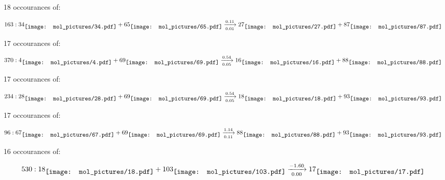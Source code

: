 \documentclass{article}
\begin{document}
18 occourances of:

$$
163:  
34
\raisebox{-.5\height}{\texttt{[image: mol\_pictures/34.pdf]}}
+
65
\raisebox{-.5\height}{\texttt{[image: mol\_pictures/65.pdf]}}
\xrightarrow[0.01]{0.11}
27
\raisebox{-.5\height}{\texttt{[image: mol\_pictures/27.pdf]}}
+
87
\raisebox{-.5\height}{\texttt{[image: mol\_pictures/87.pdf]}}
$$



\vspace{1cm}


17 occourances of:

$$
370:  
4
\raisebox{-.5\height}{\texttt{[image: mol\_pictures/4.pdf]}}
+
69
\raisebox{-.5\height}{\texttt{[image: mol\_pictures/69.pdf]}}
\xrightarrow[0.05]{0.54}
16
\raisebox{-.5\height}{\texttt{[image: mol\_pictures/16.pdf]}}
+
88
\raisebox{-.5\height}{\texttt{[image: mol\_pictures/88.pdf]}}
$$



\vspace{1cm}


17 occourances of:

$$
234:  
28
\raisebox{-.5\height}{\texttt{[image: mol\_pictures/28.pdf]}}
+
69
\raisebox{-.5\height}{\texttt{[image: mol\_pictures/69.pdf]}}
\xrightarrow[0.05]{0.54}
18
\raisebox{-.5\height}{\texttt{[image: mol\_pictures/18.pdf]}}
+
93
\raisebox{-.5\height}{\texttt{[image: mol\_pictures/93.pdf]}}
$$



\vspace{1cm}


17 occourances of:

$$
96:  
67
\raisebox{-.5\height}{\texttt{[image: mol\_pictures/67.pdf]}}
+
69
\raisebox{-.5\height}{\texttt{[image: mol\_pictures/69.pdf]}}
\xrightarrow[0.11]{1.14}
88
\raisebox{-.5\height}{\texttt{[image: mol\_pictures/88.pdf]}}
+
93
\raisebox{-.5\height}{\texttt{[image: mol\_pictures/93.pdf]}}
$$



\vspace{1cm}


16 occourances of:

$$
530:  
18
\raisebox{-.5\height}{\texttt{[image: mol\_pictures/18.pdf]}}
+
103
\raisebox{-.5\height}{\texttt{[image: mol\_pictures/103.pdf]}}
\xrightarrow[0.00]{-1.60}
17
\raisebox{-.5\height}{\texttt{[image: mol\_pictures/17.pdf]}}
$$
\end{document}
